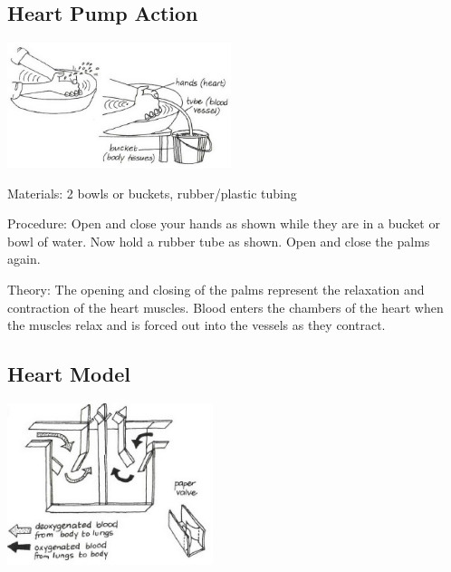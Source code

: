 \begin{multicols}{2}
\subsection{Heart Pump Action} %

\begin{center}
\includegraphics[width=0.49\textwidth]{./img/vso/heart-pump.jpg}
\end{center}

\begin{description*}
\item[Materials:]{2 bowls or buckets, rubber/plastic tubing}
\item[Procedure:]{Open and close your hands as
shown while they are in a bucket
or bowl of water. Now hold a
rubber tube as shown. Open and
close the palms again. }
\item[Theory:]{The opening and closing of the palms represent the relaxation and contraction of the heart
muscles. Blood enters the chambers of the heart when the muscles relax and is forced out
into the vessels as they contract.}
\end{description*}

\subsection{Heart Model} %

\begin{center}
\includegraphics[width=0.45\textwidth]{./img/vso/heart-model.jpg}
\end{center}


\end{multicols}

